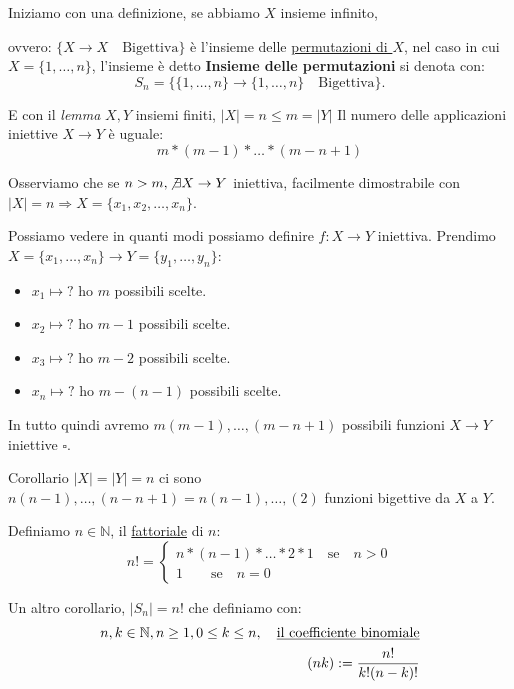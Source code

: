 \documentclass{article}
\begin{document}
Iniziamo con una definizione, se abbiamo $X$ insieme infinito, \par ovvero: $\{X \to X \quad \mbox{Bigettiva}\}$ è l'insieme delle \underline{permutazioni di $X$}, nel caso in cui $X = \{1,\ldots, n\}$, l'insieme è detto \textbf{Insieme delle permutazioni} si denota con:
\begin{equation*}
        S_n = \{\{1,\ldots, n\} \to \{ 1,\ldots,n\} \quad \mbox{Bigettiva}\}.
\end{equation*}

E con il \textit{lemma} $X,Y$ insiemi finiti, $|X| = n \le m = |Y|$ Il numero delle applicazioni iniettive $X \to Y$ è uguale:
\begin{equation*}
        m * (m-1)*\ldots*(m-n+1)
\end{equation*}

Osserviamo che se $n > m, \not \exists X \to Y$ iniettiva, facilmente dimostrabile con $|X| = n \Rightarrow X = \{x_1,x_2,\ldots,x_n\}$. \par
Possiamo vedere in quanti modi possiamo definire $f:X \to Y$ iniettiva. 
Prendimo $X = \{x_1,\ldots,x_n\} \to Y = \{y_1,\ldots,y_n\}$:
\begin{itemize}
        \item $x_1 \mapsto \mbox{?}$ ho $m$ possibili scelte.
        \item $x_2 \mapsto \mbox{?}$ ho $m-1$ possibili scelte.
        \item $x_3 \mapsto \mbox{?}$ ho $m-2$ possibili scelte.
        \item $x_n \mapsto \mbox{?}$ ho $m-(n-1)$ possibili scelte.
\end{itemize}

In tutto quindi avremo $m(m-1),\ldots,(m-n+1)$ possibili funzioni $X \to Y$ iniettive $\square$. \par

Corollario $|X| = |Y| = n$ ci sono $n(n-1),\ldots,(n-n+1) = n(n-1),\ldots,(2)$ funzioni bigettive da $X$ a $Y$. \par
Definiamo $n \in \mathbb{N}$, il \underline{fattoriale} di $n$:
\[ n! = 
\begin{cases}
        n * (n-1) * \ldots * 2 * 1 \quad \mbox{se} \quad n>0\\
        1 \quad \quad \mbox{se} \quad n = 0
\end{cases}
\]

Un altro corollario, $|S_n| = n$! che definiamo con:
\begin{align*}
        n,k \in \mathbb{N}, n \ge 1, 0 \le k \le n, \quad \mbox{\underline{il coefficiente binomiale}} \\
        (n k) := \frac{n!}{k!(n-k)!}
\end{align*}
\end{document}
